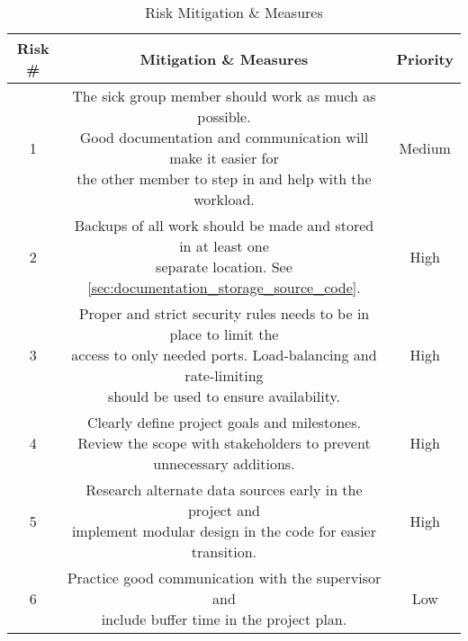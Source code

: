 \begin{table}[H]
    \centering
    \begin{tabular}{|c|c|c|}
    \hline
    Risk \# & Mitigation \& Measures & Priority \\
    \hline
    1 & \makecell{The sick group member should work as much as possible. \\ Good documentation and communication will make it easier for \\ the other member to step in and help with the workload.} & Medium \cellcolor[HTML]{fff000} \\
    \hline
    2 & \makecell{Backups of all work should be made and stored in at least one \\separate location. See \ref{sec:documentation_storage_source_code}.} & High \cellcolor[HTML]{ff4233} \\
    \hline
    3 & \makecell{Proper and strict security rules needs to be in place to limit the \\access to only needed ports. Load-balancing and rate-limiting \\should be used to ensure availability.} & High \cellcolor[HTML]{ff4233} \\
    \hline
    4 & \makecell{Clearly define project goals and milestones. \\ Review the scope with stakeholders to prevent unnecessary additions.} & High \cellcolor[HTML]{ff4233} \\
    \hline
    5 & \makecell{Research alternate data sources early in the project and \\ implement modular design in the code for easier transition.} & High \cellcolor[HTML]{ff4233} \\
    \hline
    6 & \makecell{Practice good communication with the supervisor and \\ include buffer time in the project plan.} & Low \cellcolor[HTML]{74ff00} \\
    \hline
    \end{tabular}
    \caption{Risk Mitigation \& Measures}
    \label{tab:risk_mitigation}
\end{table}
